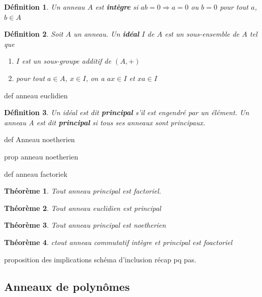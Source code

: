 \documentclass[a4paper,12pt]{report}  %
\theoremstyle{definitionstyle}
\newtheorem{definition}{Définition}[chapter] %
\theoremstyle{examplestyle}
\theoremstyle{remarkstyle}
\theoremstyle{propositionstyle}
\theoremstyle{theoremstyle}
\newtheorem{theoreme}{Théorème}[chapter]  %
\theoremstyle{proofstyle}
\begin{document}
	\begin{definition}
		Un anneau $A$ est \textbf{intègre} si $ab=0 \Rightarrow a = 0$ ou $b = 0$ pour tout $a$, $b \in A$
	\end{definition}

	\begin{definition}
		Soit $A$ un anneau. Un \textbf{idéal} $I$ de $A$ est un sous-ensemble de $A$ tel que
		\begin{enumerate}
			\item $I$ est un sous-groupe additif de $(A, +)$
			\item pour tout $a \in A$, $x \in I$, on a $ax \in I$ et $xa \in I$
		\end{enumerate}
	\end{definition}

	def anneau euclidien
	
	\begin{definition}
		Un idéal est dit \textbf{principal} s'il est engendré par un élément. Un anneau A est dit \textbf{principal} si tous ses anneaux sont principaux.
	\end{definition} 
	
		

	def Anneau noetherien
	
	prop anneau noetherien
	
	
	def anneau factoriek
	
	\begin{theoreme}
		Tout anneau principal est factoriel.
	\end{theoreme}
	
	
	\begin{theoreme}
		Tout anneau euclidien est principal
	\end{theoreme}
	
	\begin{theoreme}
		Tout anneau principal est noetherien
	\end{theoreme}
	
	
	\begin{theoreme}
		ctout anneau commutatif intègre et principal est foactoriel
	\end{theoreme}
	
	
	

	
	
	proposition des implications
	schéma d'inclusion récap pq pas.
	
	\subsection{Anneaux de polynômes}
	
\end{document}
